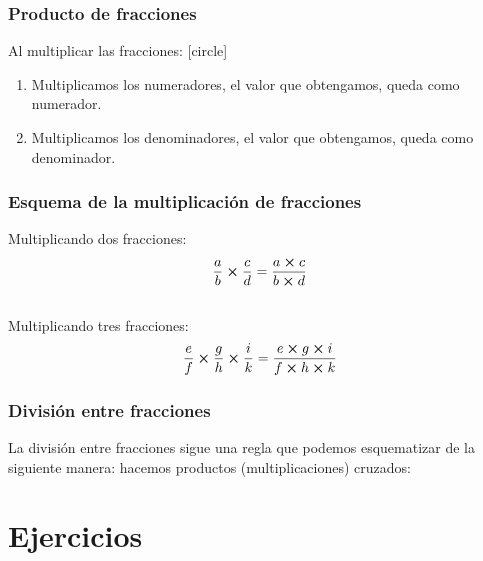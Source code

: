 \begin{frame}
\frametitle{Producto de fracciones}
Al multiplicar las fracciones:
[circle]
\begin{enumerate}[<+->]
\item Multiplicamos los numeradores, el valor que obtengamos, queda como numerador.
\item Multiplicamos los denominadores, el valor que obtengamos, queda como denominador.
\end{enumerate}
\end{frame}
\begin{frame}
\frametitle{Esquema de la multiplicación de fracciones}
Multiplicando dos fracciones:
\begin{align*}
\dfrac{a}{b} \cp \dfrac{c}{d} = \dfrac{a \cp c}{b \cp d}
\end{align*}
\\
\bigskip
\pause
Multiplicando tres fracciones:
\begin{align*}
\dfrac{e}{f} \cp \dfrac{g}{h} \cp \dfrac{i}{k} = \dfrac{e \cp g \cp i}{f \cp h \cp k} 
\end{align*}
\end{frame}
\begin{frame}
\frametitle{División entre fracciones}
La división entre fracciones sigue una regla que podemos esquematizar de la siguiente manera: hacemos productos (multiplicaciones) cruzados:
\begin{figure}
\end{figure}
\end{frame}

\section{Ejercicios}
